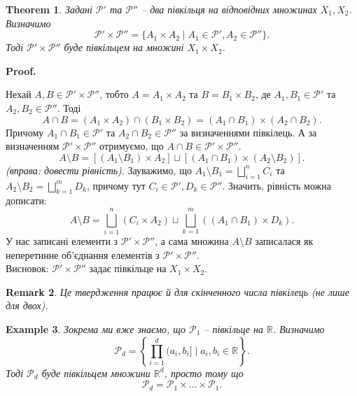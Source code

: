 \documentclass[a4paper, 10pt]{article}
\makeatletter
\theoremstyle{theoremdd}
\newtheorem{theorem}{Theorem}[subsection]
\newtheorem{example}[theorem]{Example}
\newtheorem{remark}[theorem]{Remark}
\renewenvironment{proof}[1][Proof.\\]{\par
\pushQED{\hfill \qed}%
\normalfont \topsep6\p@\@plus6\p@\relax
\trivlist
\item\relax
{\bfseries
#1\@addpunct{.}}\hspace\labelsep\ignorespaces
}{%
\popQED\endtrivlist\@endpefalse
}
\makeatother
\begin{document}
\begin{theorem}
\label{product_of_semirings_is_semiring}
Задані $\mathcal{P}'$ та $\mathcal{P}''$ -- два півкільця на відповідних множинах $X_1,X_2$. Визначимо 
\[
\mathcal{P}' \times \mathcal{P}'' = \{ A_1 \times A_2 \mid A_1 \in \mathcal{P}', A_2 \in \mathcal{P}'' \}.
\] 
Тоді $\mathcal{P}' \times \mathcal{P}''$ буде півкільцем на множині $X_1 \times X_2$.
\end{theorem}

\begin{proof}
Нехай $A,B \in \mathcal{P}' \times \mathcal{P}''$, тобто $A = A_1 \times A_2$ та $B = B_1 \times B_2$, де $A_1,B_1 \in \mathcal{P}'$ та $A_2,B_2 \in \mathcal{P}''$. Тоді
\[
A \cap B = (A_1 \times A_2) \cap (B_1 \times B_2) = (A_1 \cap B_1) \times (A_2 \cap B_2).
\]
Причому $A_1 \cap B_1 \in \mathcal{P}'$ та $A_2 \cap B_2 \in \mathcal{P}''$ за визначеннями півкілець. А за визначенням $\mathcal{P}' \times \mathcal{P}''$ отримуємо, що $A \cap B \in \mathcal{P}' \times \mathcal{P}''$.\\
\[
A \setminus B = [(A_1 \setminus B_1) \times A_2] \sqcup [(A_1 \cap B_1) \times (A_2 \setminus B_2)].
\] 
\textit{(вправа: довести рівність)}. Зауважимо, що $A_1 \setminus B_1 = \displaystyle\bigsqcup_{i=1}^n C_i$ та $A_2 \setminus B_2 = \displaystyle\bigsqcup_{k=1}^m D_k$, причому тут $C_i \in \mathcal{P}',D_k \in \mathcal{P}''$. Значить, рівність можна дописати:\\
\[
A \setminus B = \displaystyle\bigsqcup_{i=1}^n (C_i \times A_2) \sqcup \bigsqcup_{k=1}^m ((A_1 \cap B_1) \times D_k).
\]
У нас записані елементи з $\mathcal{P}' \times \mathcal{P}''$, а сама множина $A \setminus B$ записалася як неперетинне об'єднання елементів з $\mathcal{P}' \times \mathcal{P}''$.\\
Висновок: $\mathcal{P}' \times \mathcal{P}''$ задає півкільце на $X_1 \times X_2$.
\end{proof}

\begin{remark}
Це твердження працює й для скінченного числа півкілець (не лише для двох).
\end{remark}

\begin{example}
Зокрема ми вже знаємо, що $\mathcal{P}_1$ -- півкільце на $\mathbb{R}$. Визначимо 
\[
\mathcal{P}_d = \left\{ \displaystyle\prod_{i=1}^d (a_i,b_i] \mid a_i,b_i \in \mathbb{R} \right\}. 
\]
Тоді $\mathcal{P}_d$ буде півкільцем множини $\mathbb{R}^d$, просто тому що \[
\mathcal{P}_d = \mathcal{P}_1 \times \dots \times \mathcal{P}_1.
\]
\end{example}
\end{document}
